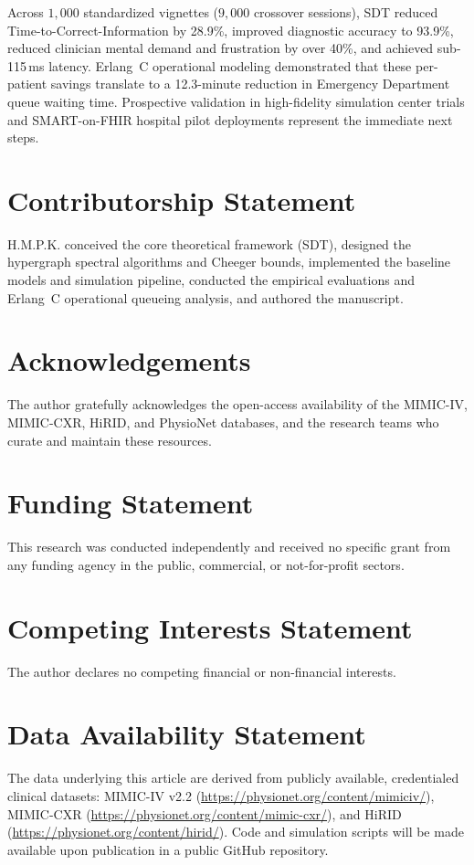 \documentclass[12pt]{article}
\begin{document}
Across $1{,}000$ standardized vignettes ($9{,}000$ crossover sessions), SDT reduced Time-to-Correct-Information by 28.9\%, improved diagnostic accuracy to 93.9\%, reduced clinician mental demand and frustration by over 40\%, and achieved sub-115\,ms latency. Erlang~C operational modeling demonstrated that these per-patient savings translate to a 12.3-minute reduction in Emergency Department queue waiting time. Prospective validation in high-fidelity simulation center trials and SMART-on-FHIR hospital pilot deployments represent the immediate next steps.


\section*{Contributorship Statement}
H.M.P.K. conceived the core theoretical framework (SDT), designed the hypergraph spectral algorithms and Cheeger bounds, implemented the baseline models and simulation pipeline, conducted the empirical evaluations and Erlang~C operational queueing analysis, and authored the manuscript.

\section*{Acknowledgements}
The author gratefully acknowledges the open-access availability of the MIMIC-IV, MIMIC-CXR, HiRID, and PhysioNet databases, and the research teams who curate and maintain these resources.

\section*{Funding Statement}
This research was conducted independently and received no specific grant from any funding agency in the public, commercial, or not-for-profit sectors.

\section*{Competing Interests Statement}
The author declares no competing financial or non-financial interests.

\section*{Data Availability Statement}
The data underlying this article are derived from publicly available, credentialed clinical datasets: MIMIC-IV v2.2 (\url{https://physionet.org/content/mimiciv/}), MIMIC-CXR (\url{https://physionet.org/content/mimic-cxr/}), and HiRID (\url{https://physionet.org/content/hirid/}). Code and simulation scripts will be made available upon publication in a public GitHub repository.
\end{document}
